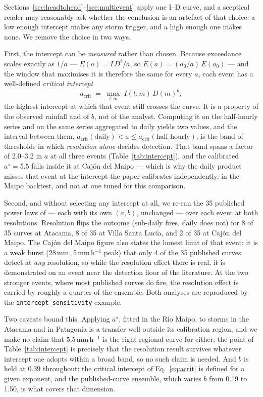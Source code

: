 \documentclass[authoryear,preprint,review,12pt]{elsarticle}
\begin{document}
Sections~\ref{sec:headtohead}--\ref{sec:multievent} apply one I--D curve, and a
sceptical reader may reasonably ask whether the conclusion is an artefact of that
choice: a low enough intercept makes any storm trigger, and a high enough one makes
none. We remove the choice in two ways.

First, the intercept can be \emph{measured} rather than chosen. Because exceedance
scales exactly as $1/a$ --- $E(a)=I\,D^{b}/a$, so $E(a)=(a_0/a)\,E(a_0)$ --- and the
window that maximises it is therefore the same for every $a$, each event has a
well-defined \emph{critical intercept}
\begin{equation}
a_\mathrm{crit} \;=\; \max_{t,m}\; I(t,m)\,D(m)^{b},
\label{eq:acrit}
\end{equation}
the highest intercept at which that event still crosses the curve. It is a property
of the observed rainfall and of $b$, not of the analyst. Computing it on the
half-hourly series and on the same series aggregated to daily yields two values,
and the interval between them,
$a_\mathrm{crit}(\text{daily}) < a \leq a_\mathrm{crit}(\text{half-hourly})$, is the
band of thresholds in which \emph{resolution alone} decides detection. That band
spans a factor of 2.0--3.2 in $a$ at all three events (Table~\ref{tab:intercept}),
and the calibrated $a^\star=5.5$ falls inside it at Caj\'on del Maipo --- which is
why the daily product misses that event at the intercept the paper calibrates
independently, in the Maipo backtest, and not at one tuned for this comparison.

Second, and without selecting any intercept at all, we re-ran the 35 published
power laws of \citet{guzzetti2007} --- each with its own $(a,b)$, unchanged ---
over each event at both resolutions. Resolution flips the outcome (sub-daily fires,
daily does not) for 8 of 35 curves at Atacama, 8 of 35 at Villa Santa Luc\'ia, and 2
of 35 at Caj\'on del Maipo. The Caj\'on del Maipo figure also states the honest
limit of that event: it is a weak burst (28\,mm, 5\,mm\,h$^{-1}$ peak) that only 4
of the 35 published curves detect at \emph{any} resolution, so while the
resolution effect there is real, it is demonstrated on an event near the detection
floor of the literature. At the two stronger events, where most published curves do
fire, the resolution effect is carried by roughly a quarter of the ensemble. Both
analyses are reproduced by the \texttt{intercept\_sensitivity} example.

Two caveats bound this. Applying $a^\star$, fitted in the R\'io Maipo, to storms in
the Atacama and in Patagonia is a transfer well outside its calibration region, and
we make no claim that 5.5\,mm\,h$^{-1}$ is the right regional curve for either;
the point of Table~\ref{tab:intercept} is precisely that the resolution result
survives whatever intercept one adopts within a broad band, so no such claim is
needed. And $b$ is held at 0.39 throughout: the critical intercept of
Eq.~\ref{eq:acrit} is defined for a given exponent, and the published-curve
ensemble, which varies $b$ from 0.19 to 1.50, is what covers that dimension.
\end{document}
